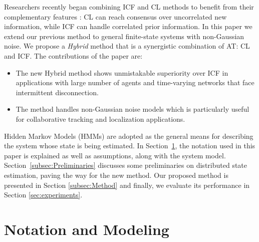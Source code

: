 \documentclass[conference]{IEEEtran}
\theoremstyle{remark}
\newcommand{\axx}[1]{{\color{blue} AT: #1  \ }}  %
\begin{document}
Researchers recently began combining ICF and CL 
methods to benefit from their complementary features 
\cite{battistelli2016stability,battistelli2014parallel,tamjidi2016unifying}: CL 
can reach consensus over uncorrelated new information, while ICF can handle  
correlated prior information. 
In this paper we extend our previous method \cite{tamjidi2016unifying} to 
general finite-state systems with non-Gaussian noise. We propose a 
\emph{Hybrid} method that is a synergistic combination of \axx{CL} and ICF.
The contributions of the 
paper are:
\begin{itemize}
\item The new Hybrid method shows unmistakable superiority over ICF in applications with large number of agents and time-varying networks that face intermittent disconnection. 
\item The method handles non-Gaussian noise models 
which is particularly 
useful for collaborative tracking and localization applications.
\end{itemize}

Hidden Markov Models (HMMs) are adopted as the general means for describing the system whose state is being estimated.  In Section~\ref{subsec:assump_not}, the notation used in this paper is explained as well 
as assumptions, along with the system model. Section~\ref{subsec:Preliminaries} discusses 
some preliminaries on distributed state estimation, paving the way for the new  
method. Our proposed method is presented in Section \ref{subsec:Method} and finally, we evaluate its performance in Section 
\ref{sec:experiments}.  

\section{Notation and Modeling} \label{subsec:assump_not}
\end{document}
